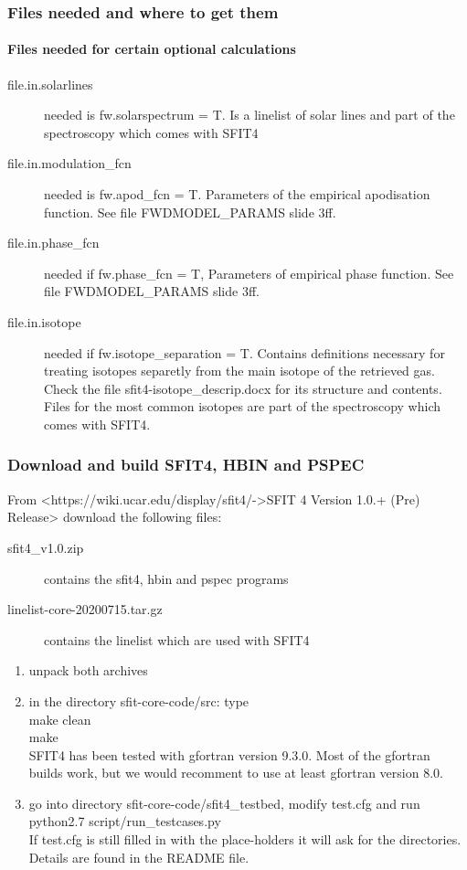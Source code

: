\documentclass[notes=hide]{beamer}
\begin{document}
\begin{frame}
  \frametitle{Files needed and where to get them}
  \framesubtitle{Files needed for certain optional calculations}
  \begin{description}
  \item[file.in.solarlines] needed is fw.solarspectrum = T. Is a
    linelist of solar lines and part of the spectroscopy which comes
    with SFIT4
  \item[file.in.modulation\_fcn] needed is fw.apod\_fcn =
    T. Parameters of the empirical apodisation function. See file
    FWDMODEL\_PARAMS slide 3ff.
  \item[file.in.phase\_fcn] needed if fw.phase\_fcn = T, Parameters of
    empirical phase function. See file
    FWDMODEL\_PARAMS slide 3ff. 
  \item[file.in.isotope] needed if fw.isotope\_separation =
    T. Contains definitions necessary for treating isotopes separetly
    from the main isotope of the retrieved gas. Check the file
    sfit4-isotope\_descrip.docx for its structure and
    contents. Files for the most common isotopes are part of the
    spectroscopy which comes with SFIT4.
  \end{description}
\end{frame}

\begin{frame}
  \frametitle{Download and build SFIT4, HBIN and PSPEC}
  From <https://wiki.ucar.edu/display/sfit4/->SFIT 4 Version 1.0.+
  (Pre) Release> download the following files:
  \begin{description}
  \item [sfit4\_v1.0.zip] contains the sfit4, hbin and pspec programs
  \item[linelist-core-20200715.tar.gz]  contains the linelist which
    are used with SFIT4
  \end{description}
  \begin{enumerate}
  \item unpack both archives
  \item in the directory sfit-core-code/src: type\\
    make clean\\
    make\\
    SFIT4 has been tested with gfortran version 9.3.0. Most of the
    gfortran builds work, but we would recomment to use at least
    gfortran version 8.0.
  \item go into directory sfit-core-code/sfit4\_testbed, modify
    test.cfg and run\\
    python2.7 script/run\_testcases.py\\
    If test.cfg is still filled in with the place-holders it will ask
    for the directories. Details are found in the README file.
  \end{enumerate}
\end{frame}
\end{document}
